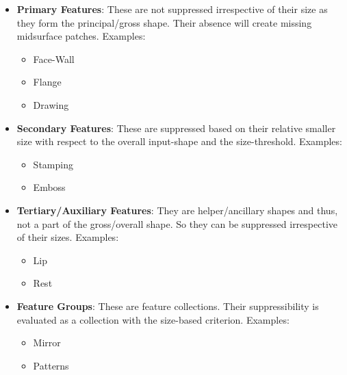 \begin{minipage}[c]{0.98\linewidth}
\begin{minipage}[t]{0.5\linewidth}
\begin{itemize}
[noitemsep,topsep=2pt,parsep=2pt,partopsep=2pt]
\item \textbf{Primary Features}: These are not suppressed irrespective of their size as they form the principal/gross shape.  Their absence will create missing midsurface patches. Examples:
	\begin{itemize} [noitemsep,topsep=2pt,parsep=2pt,partopsep=2pt]
	\item Face-Wall
	\item Flange
	\item Drawing
	\end{itemize}
\item \textbf{Secondary Features}: These are suppressed based on their relative smaller size with respect to the overall input-shape and the size-threshold. 
 Examples:
	\begin{itemize} [noitemsep,topsep=2pt,parsep=2pt,partopsep=2pt]
	\item Stamping
	\item Emboss 
	\end{itemize}
	
\item \textbf{Tertiary/Auxiliary Features}: They are helper/ancillary shapes and thus, not a part of the gross/overall shape. So they can be suppressed irrespective of their sizes.
Examples:
	\begin{itemize} [noitemsep,topsep=2pt,parsep=2pt,partopsep=2pt]
	\item Lip
	\item Rest 
	\end{itemize}
	
		
\item \textbf{Feature Groups}: These are feature collections. Their suppressibility is evaluated as a collection with the size-based criterion. 	Examples:
\begin{itemize} [noitemsep,topsep=2pt,parsep=2pt,partopsep=2pt]
	\item Mirror
	\item Patterns
	\end{itemize}
\end{itemize}


\end{minipage}
\end{minipage}
